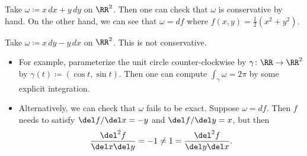 \documentclass[../notes.tex]{subfiles}
\begin{document}
\begin{example}
	Take $\omega\coloneqq x\,dx+y\,dy$ on $\RR^2$. Then one can check that $\omega$ is conservative by hand. On the other hand, we can see that $\omega=df$ where $f(x,y)=\frac12\left(x^2+y^2\right)$.
\end{example}
\begin{example} \label{ex:line-integrals}
	Take $\omega\coloneqq x\,dy-y\,dx$ on $\RR^2$. This is not conservative.
	\begin{itemize}
		\item For example, parameterize the unit circle counter-clockwise by $\gamma\colon\RR\to\RR^2$ by $\gamma(t)\coloneqq(\cos t,\sin t)$. Then one can compute $\int_\gamma\omega=2\pi$ by some explicit integration.
		\item Alternatively, we can check that $\omega$ fails to be exact. Suppose $\omega=df$. Then $f$ needs to satisfy $\del f/\del x=-y$ and $\del f/\del y=x$, but then
		\[\frac{\del^2f}{\del x\del y}=-1\ne1=\frac{\del^2f}{\del y\del x}.\]
	\end{itemize}
\end{example}
\end{document}
